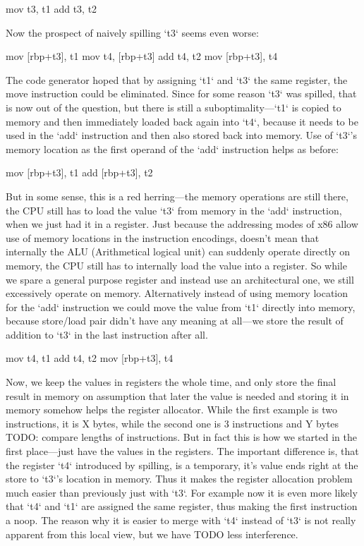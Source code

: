 \begtt
mov t3, t1
add t3, t2
\endtt

Now the prospect of naively spilling `t3` seems even worse:

\begtt
mov [rbp+t3], t1
mov t4, [rbp+t3]
add t4, t2
mov [rbp+t3], t4
\endtt

The code generator hoped that by assigning `t1` and `t3` the same register, the
move instruction could be eliminated. Since for some reason `t3` was spilled,
that is now out of the question, but there is still a suboptimality---`t1` is
copied to memory and then immediately loaded back again into `t4`, because it
needs to be used in the `add` instruction and then also stored back into memory.
Use of `t3`'s memory location as the first operand of the `add` instruction
helps as before:

\begtt
mov [rbp+t3], t1
add [rbp+t3], t2
\endtt

But in some sense, this is a red herring---the memory operations are still
there, the CPU still has to load the value `t3` from memory in the `add`
instruction, when we just had it in a register. Just because the addressing
modes of x86 allow use of memory locations in the instruction encodings, doesn't
mean that internally the ALU (Arithmetical logical unit) can suddenly operate
directly on memory, the CPU still has to internally load the value into a
register. So while we spare a general purpose register and instead use an
architectural one, we still excessively operate on memory. Alternatively instead of
using memory location for the `add` instruction we could move the value from
`t1` directly into memory, because store/load pair didn't have any meaning at
all---we store the result of addition to `t3` in the last instruction after all.

\begtt
mov t4, t1
add t4, t2
mov [rbp+t3], t4
\endtt

Now, we keep the values in registers the whole time, and only store the final
result in memory on assumption that later the value is needed and storing it in
memory somehow helps the register allocator. While the first example is two
instructions, it is X bytes, while the second one is 3 instructions and Y bytes
TODO: compare lengths of instructions. But in fact this is how we started in the
first place---just have the values in the registers. The important difference
is, that the register `t4` introduced by spilling, is a temporary, it's value
ends right at the store to `t3`'s location in memory. Thus it makes the register
allocation problem much easier than previously just with `t3`. For example now
it is even more likely that `t4` and `t1` are assigned the same register, thus
making the first instruction a noop. The reason why it is easier to merge with
`t4` instead of `t3` is not really apparent from this local view, but we have
TODO less interference.

